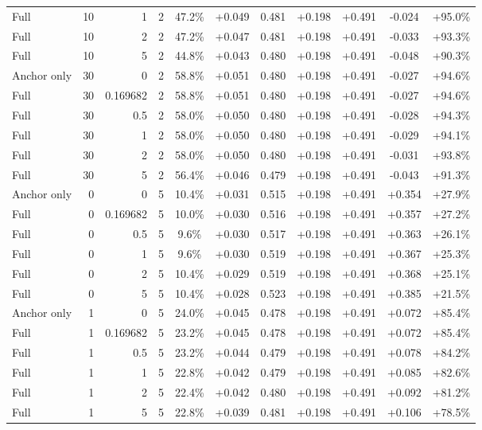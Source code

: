 \begin{table}[htbp]
\begin{tabular}{lrrrccccccc}
Full & 10 & 1 & 2 & 47.2\% & +0.049 & 0.481 & +0.198 & +0.491 & -0.024 & +95.0\% \\
Full & 10 & 2 & 2 & 47.2\% & +0.047 & 0.481 & +0.198 & +0.491 & -0.033 & +93.3\% \\
Full & 10 & 5 & 2 & 44.8\% & +0.043 & 0.480 & +0.198 & +0.491 & -0.048 & +90.3\% \\
Anchor only & 30 & 0 & 2 & 58.8\% & +0.051 & 0.480 & +0.198 & +0.491 & -0.027 & +94.6\% \\
Full & 30 & 0.169682 & 2 & 58.8\% & +0.051 & 0.480 & +0.198 & +0.491 & -0.027 & +94.6\% \\
Full & 30 & 0.5 & 2 & 58.0\% & +0.050 & 0.480 & +0.198 & +0.491 & -0.028 & +94.3\% \\
Full & 30 & 1 & 2 & 58.0\% & +0.050 & 0.480 & +0.198 & +0.491 & -0.029 & +94.1\% \\
Full & 30 & 2 & 2 & 58.0\% & +0.050 & 0.480 & +0.198 & +0.491 & -0.031 & +93.8\% \\
Full & 30 & 5 & 2 & 56.4\% & +0.046 & 0.479 & +0.198 & +0.491 & -0.043 & +91.3\% \\
Anchor only & 0 & 0 & 5 & 10.4\% & +0.031 & 0.515 & +0.198 & +0.491 & +0.354 & +27.9\% \\
Full & 0 & 0.169682 & 5 & 10.0\% & +0.030 & 0.516 & +0.198 & +0.491 & +0.357 & +27.2\% \\
Full & 0 & 0.5 & 5 & 9.6\% & +0.030 & 0.517 & +0.198 & +0.491 & +0.363 & +26.1\% \\
Full & 0 & 1 & 5 & 9.6\% & +0.030 & 0.519 & +0.198 & +0.491 & +0.367 & +25.3\% \\
Full & 0 & 2 & 5 & 10.4\% & +0.029 & 0.519 & +0.198 & +0.491 & +0.368 & +25.1\% \\
Full & 0 & 5 & 5 & 10.4\% & +0.028 & 0.523 & +0.198 & +0.491 & +0.385 & +21.5\% \\
Anchor only & 1 & 0 & 5 & 24.0\% & +0.045 & 0.478 & +0.198 & +0.491 & +0.072 & +85.4\% \\
Full & 1 & 0.169682 & 5 & 23.2\% & +0.045 & 0.478 & +0.198 & +0.491 & +0.072 & +85.4\% \\
Full & 1 & 0.5 & 5 & 23.2\% & +0.044 & 0.479 & +0.198 & +0.491 & +0.078 & +84.2\% \\
Full & 1 & 1 & 5 & 22.8\% & +0.042 & 0.479 & +0.198 & +0.491 & +0.085 & +82.6\% \\
Full & 1 & 2 & 5 & 22.4\% & +0.042 & 0.480 & +0.198 & +0.491 & +0.092 & +81.2\% \\
Full & 1 & 5 & 5 & 22.8\% & +0.039 & 0.481 & +0.198 & +0.491 & +0.106 & +78.5\% \\

\end{tabular}
\end{table}
